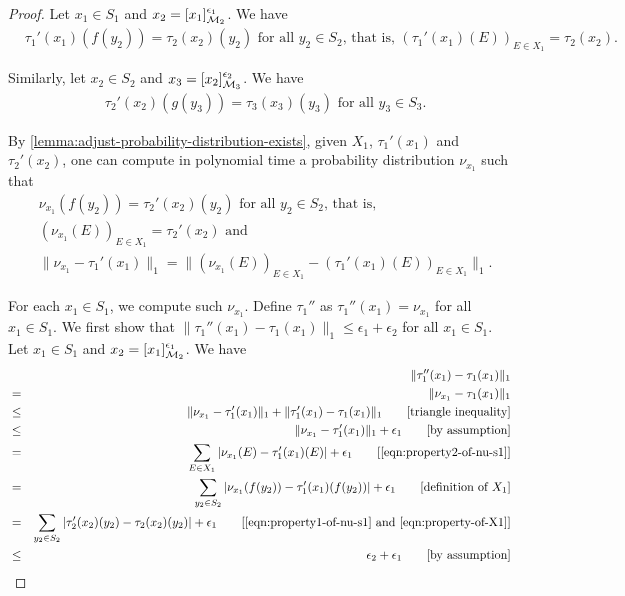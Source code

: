 \begin{proof}
	Let $x_1 \in S_1$ and $x_2 = [x_1]^{\epsilon_1}_{\mathcal{M}_2}$. We have
	\begin{align}
	&\tau_1'(x_1)(f(y_2))= \tau_2(x_2)(y_2) \text{ for all $y_2 \in S_2$, that is,  }(\tau_1'(x_1)(E))_{E \in X_1} = \tau_2(x_2) \label{eqn:property-of-X1}.
	\end{align} 
	
	Similarly, 	let $x_2 \in S_2$ and $x_3 = [x_2]^{\epsilon_2}_{\mathcal{M}_3}$. We have
	\begin{align}
	&\tau_2'(x_2)(g(y_3))= \tau_3(x_3)(y_3) \text{ for all $y_3 \in S_3$}\label{eqn:property-of-g}.
	\end{align} 
	
	By \cref{lemma:adjust-probability-distribution-exists}, given $X_1$, $\tau_1'(x_1)$ and $\tau_2'(x_2)$, one can compute in polynomial time a probability distribution $\nu_{x_1}$ such that 
	\begin{align}
	&\nu_{x_1}(f(y_2))= \tau_2'(x_2)(y_2) \text{ for all } y_2 \in S_2 \text{, that is,  }  \label{eqn:property1-of-nu-s1}\\
	&(\nu_{x_1}(E))_{E \in X_1} = \tau_2'(x_2) \text{ and }  \nonumber\\
	&\|\nu_{x_1} -  \tau_1'(x_1)\|_1 = \| (\nu_{x_1}(E))_{E \in X_1} - (\tau_1'(x_1)(E))_{E \in X_1}\|_1 \label{eqn:property2-of-nu-s1}.
	\end{align}
	
	For each $x_1 \in S_1$, we compute such $\nu_{x_1}$. Define $\tau_1''$ as $\tau_1''(x_1) = \nu_{x_1}$ for all $x_1 \in S_1$. We first show that $\|\tau_1''(x_1)- \tau_1(x_1)\|_1 \le \epsilon_1+\epsilon_2$ for all $x_1 \in S_1$. Let $x_1 \in S_1$ and $x_2 = [x_1]^{\epsilon_1}_{\mathcal{M}_2}$. We have 
	\begin{eqnarray*} 
		&&    \|\tau_1''(x_1) - \tau_1(x_1)\|_1 \\
		&=& \|\nu_{x_1} - \tau_1(x_1)\|_1 \\
		&\le& \|\nu_{x_1} - \tau_1'(x_1)\|_1 +   \|\tau_1'(x_1) - \tau_1(x_1)\|_1 \commenteq{triangle inequality}\\
		& \le & \|\nu_{x_1} - \tau_1'(x_1)\|_1 +   \epsilon_1 \commenteq{by assumption}\\
		& = & \sum_{E \in X_1} |\nu_{x_1}(E) - \tau_1'(x_1)(E)| +   \epsilon_1\commenteq{\cref{eqn:property2-of-nu-s1}}\\
		& = & \sum_{y_2 \in S_2} |\nu_{x_1}(f(y_2)) - \tau_1'(x_1)(f(y_2))| +   \epsilon_1\commenteq{definition of $X_1$}\\ 	 	
		& = &  \sum_{y_2 \in S_2} |\tau_2'(x_2)(y_2) - \tau_2(x_2)(y_2)| +   \epsilon_1\commenteq{\cref{eqn:property1-of-nu-s1} and \cref{eqn:property-of-X1}}\\ 	 	
		& \le &  \epsilon_2 +   \epsilon_1\commenteq{by assumption}\\ 	 	 			 			
	\end{eqnarray*}
	

\end{proof}
